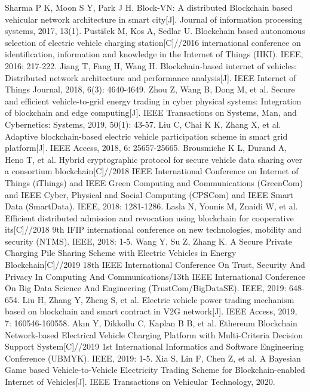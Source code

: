 \begin{thebibliography}{99}
 Sharma P K, Moon S Y, Park J H. Block-VN: A distributed Blockchain based vehicular network architecture in smart city[J]. Journal of information processing systems, 2017, 13(1).
 Pustišek M, Kos A, Sedlar U. Blockchain based autonomous selection of electric vehicle charging station[C]//2016 international conference on identification, information and knowledge in the Internet of Things (IIKI). IEEE, 2016: 217-222.
 Jiang T, Fang H, Wang H. Blockchain-based internet of vehicles: Distributed network architecture and performance analysis[J]. IEEE Internet of Things Journal, 2018, 6(3): 4640-4649.
 Zhou Z, Wang B, Dong M, et al. Secure and efficient vehicle-to-grid energy trading in cyber physical systems: Integration of blockchain and edge computing[J]. IEEE Transactions on Systems, Man, and Cybernetics: Systems, 2019, 50(1): 43-57.
 Liu C, Chai K K, Zhang X, et al. Adaptive blockchain-based electric vehicle participation scheme in smart grid platform[J]. IEEE Access, 2018, 6: 25657-25665.
 Brousmiche K L, Durand A, Heno T, et al. Hybrid cryptographic protocol for secure vehicle data sharing over a consortium blockchain[C]//2018 IEEE International Conference on Internet of Things (iThings) and IEEE Green Computing and Communications (GreenCom) and IEEE Cyber, Physical and Social Computing (CPSCom) and IEEE Smart Data (SmartData). IEEE, 2018: 1281-1286.
 Lasla N, Younis M, Znaidi W, et al. Efficient distributed admission and revocation using blockchain for cooperative its[C]//2018 9th IFIP international conference on new technologies, mobility and security (NTMS). IEEE, 2018: 1-5.
 Wang Y, Su Z, Zhang K. A Secure Private Charging Pile Sharing Scheme with Electric Vehicles in Energy Blockchain[C]//2019 18th IEEE International Conference On Trust, Security And Privacy In Computing And Communications/13th IEEE International Conference On Big Data Science And Engineering (TrustCom/BigDataSE). IEEE, 2019: 648-654.
 Liu H, Zhang Y, Zheng S, et al. Electric vehicle power trading mechanism based on blockchain and smart contract in V2G network[J]. IEEE Access, 2019, 7: 160546-160558.
 Akın Y, Dikkollu C, Kaplan B B, et al. Ethereum Blockchain Network-based Electrical Vehicle Charging Platform with Multi-Criteria Decision Support System[C]//2019 1st International Informatics and Software Engineering Conference (UBMYK). IEEE, 2019: 1-5.
 Xia S, Lin F, Chen Z, et al. A Bayesian Game based Vehicle-to-Vehicle Electricity Trading Scheme for Blockchain-enabled Internet of Vehicles[J]. IEEE Transactions on Vehicular Technology, 2020.

\end{thebibliography}
